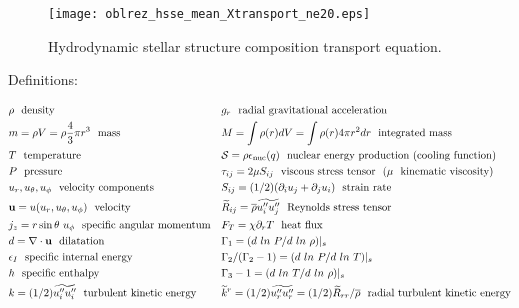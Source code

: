 \documentclass[10pt,paper=a4]{report}
\newcommand{\eht}{\overline}
\newcommand{\fht}{\widetilde}
\begin{document}
\begin{figure}[!h]
\centerline{
  \texttt{[image: oblrez\_hsse\_mean\_Xtransport\_ne20.eps]}}
\caption{Hydrodynamic stellar structure composition transport equation.}
\end{figure}


\newpage


\begin{table*}
\label{tab:rans-cont}
\caption{Definitions:}
\begin{align}                                                      
  & \rho \ \ \mbox{density}                                           & & g_r  \ \ \mbox{radial gravitational acceleration} \nonumber \\
  & m = \rho V = \rho \frac{4}{3} \pi r^3\ \ \mbox{mass}                      & & M = \int \rho(r) dV = \int \rho(r) 4 \pi r^2 dr  \ \ \mbox{integrated mass} \nonumber \\  
& T \ \ \mbox{temperature}                                          & & {\mathcal S} = \rho \epsilon_\mathrm{nuc} (q) \ \ \mbox{nuclear energy production (cooling function)} \nonumber \\
& P \ \ \mbox{pressure}                                             & & \tau_{ij} = 2\mu S_{ij} \ \ \mbox{viscous stress tensor}  \ \ (\mu \ \ \mbox{kinematic viscosity}) \nonumber \\ 
& u_r, u_\theta, u_\phi \ \ \mbox{velocity components}                 & & S_{ij} = (1/2)(\partial_i u_j + \partial_j u_i) \ \ \mbox{strain rate} \nonumber \\
& {\bf u} = u (u_r, u_\theta, u_\phi) \ \ \mbox{velocity}               & & \fht{R}_{ij} = \eht{\rho}\fht{u''_i u''_j} \ \ \mbox{Reynolds stress tensor} \nonumber \\              
& j_z = r \sin{\theta} \ u_\phi \ \ \mbox{specific angular momentum} & & F_T = \chi \partial_r T \ \ \mbox{heat flux}   \nonumber \\
& d = \nabla \cdot {\bf u} \ \ \mbox{dilatation}                     & & \Gamma_1 = (d \ ln \ P/ d \ ln \ \rho)|_s   \nonumber \\ 
& \epsilon_I \ \ \mbox{specific internal energy}                     & & \Gamma_2 / (\Gamma_2 -1) =  (d \ ln \ P/ d \ ln \ T)|_s \nonumber \\
& h \ \ \mbox{specific enthalpy}                                    & &  \Gamma_3 -1 =  (d \ ln \ T/ d \ ln \ \rho)|_s \nonumber    \\  
& k = (1/2) \fht{u''_iu''_i} \ \ \mbox{turbulent kinetic energy}    & & \fht{k}^r = (1/2) \fht{u''_ru''_r} = (1/2) \fht{R}_{rr}/\eht{\rho} \ \ \mbox{radial turbulent kinetic energy}  \nonumber \\  

\end{align}
\end{table*}
\end{document}
